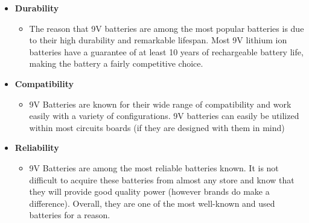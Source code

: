\documentclass[12pt]{article}
\begin{document}
{\begin{itemize}
							\item \textbf{Durability}
							\begin{itemize}
								\item The reason that 9V batteries are among the most popular batteries is due to their high durability and remarkable lifespan. Most 9V lithium ion batteries have a guarantee of at least 10 years of rechargeable battery life, making the battery a fairly competitive choice. 
							\end{itemize}
							\item \textbf{Compatibility}
							\begin{itemize}
								\item 9V Batteries are known for their wide range of compatibility and work easily with a variety of configurations. 9V batteries can easily be utilized within most circuits boards (if they are designed with them in mind)
							\end{itemize}
							\item \textbf{Reliability}
							\begin{itemize}
								\item 9V Batteries are among the most reliable batteries known. It is not difficult to acquire these batteries from almost any store and know that they will provide good quality power (however brands do make a difference). Overall, they are one of the most well-known and used batteries for a reason.
							\end{itemize}
						\end{itemize}
					}
					
\end{document}
